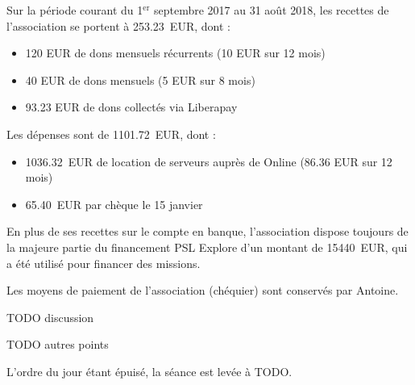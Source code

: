 \documentclass{scrartcl}
\begin{document}
Sur la période courant du 1$^{\mathrm{er}}$ septembre 2017 au 31 août 2018, les
recettes de l'association se portent à 253.23~EUR, dont :

\begin{itemize}
  \item 120 EUR de dons mensuels récurrents (10 EUR sur 12 mois)
  \item 40 EUR de dons mensuels (5 EUR sur 8 mois)
  \item 93.23 EUR de dons collectés via Liberapay
\end{itemize}

Les dépenses sont de 1101.72~EUR, dont :

\begin{itemize}
  \item 1036.32~EUR de location de serveurs auprès de Online (86.36 EUR sur 12
    mois)
  \item 65.40~EUR par chèque le 15 janvier
\end{itemize}

En plus de ses recettes sur le compte en banque, l'association dispose toujours
de la majeure partie du financement PSL Explore d'un montant de 15440~EUR, qui a
été utilisé pour financer des missions.

Les moyens de paiement de l'association (chéquier) sont conservés par Antoine.

TODO discussion

TODO autres points

\bigskip

L'ordre du jour étant épuisé, la séance est levée à TODO.
\end{document}
